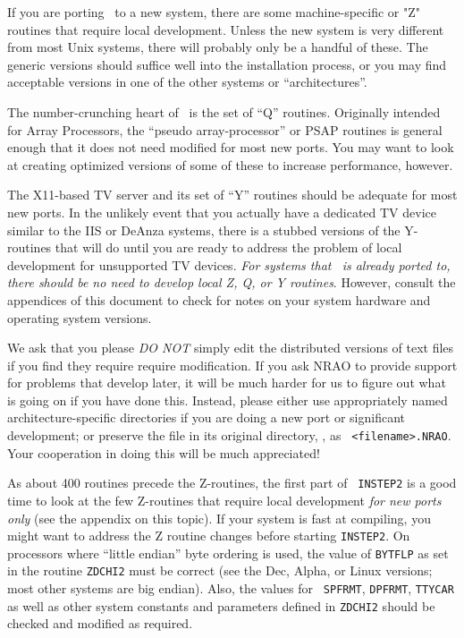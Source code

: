 If you are porting \aips\ to a new system, there are some
machine-specific or "Z" routines that require local development.  Unless
the new system is very different from most Unix systems, there will
probably only be a handful of these.  The generic versions should
suffice well into the installation process, or you may find acceptable
versions in one of the other systems or ``architectures''.

The number-crunching heart of \AIPS\ is the set of ``Q'' routines.
Originally intended for Array Processors, the ``pseudo array-processor''
or PSAP routines is general enough that it does not need modified for most
new ports.  You may want to look at creating optimized versions of some of
these to increase performance, however.

The X11-based TV server and its set of ``Y'' routines should be adequate
for most new ports.  In the unlikely event that you actually have a
dedicated TV device similar to the IIS or DeAnza systems, there is a
stubbed versions of the Y-routines that will do until you are ready to
address the problem of local development for unsupported TV devices.  {\it
For systems that \aips\ is already ported to, there should be no need to
develop local Z, Q, or Y routines\/}.  However, consult the appendices of
this document to check for notes on your system hardware and operating
system versions.

We ask that you please {\it DO NOT\/} simply edit the distributed versions
of text files if you find they require require modification.  If you ask
NRAO to provide support for problems that develop later, it will be much
harder for us to figure out what is going on if you have done this.
Instead, please either use appropriately named architecture-specific
directories if you are doing a new port or significant development; or
preserve the file in its original directory, \eg, as {\tt
<filename>.NRAO}.  Your cooperation in doing this will be much
appreciated! \medskip

As about 400 routines precede the Z-routines, the first part of {\tt
INSTEP2} is a good time to look at the few Z-routines that require local
development {\it for new ports only\/} (see the appendix on this topic).
If your system is fast at compiling, you might want to address the Z
routine changes before starting {\tt INSTEP2}.  On processors where
``little endian'' byte ordering is used, the value of {\tt BYTFLP} as set
in the routine {\tt ZDCHI2} must be correct (see the Dec, Alpha, or Linux
versions; most other systems are big endian).  Also, the values for {\tt
SPFRMT}, {\tt DPFRMT}, {\tt TTYCAR} as well as other system constants and
parameters defined in {\tt ZDCHI2} should be checked and modified as
required.

